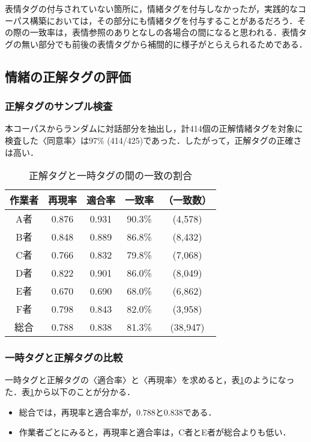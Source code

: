 \documentclass[japanese]{jnlp_1.3c}
\begin{document}
表情タグの付与されていない箇所に，情緒タグを付与しなかったが，実践的なコーパス構築においては，その部分にも情緒タグを付与することがあるだろう．その際の一致率は，表情参照のありとなしの各場合の間になると思われる．表情タグの無い部分でも前後の表情タグから補間的に様子がとらえられるためである．


\subsection{情緒の正解タグの評価} \label{sec4.3}

\subsubsection{正解タグのサンプル検査} \label{sec4.3.1}

本コーパスからランダムに対話部分を抽出し，計414個の正解情緒タグを対象に検査した〈同意率〉は97\% (414/425)であった．したがって，正解タグの正確さは高い．

\begin{table}[b]
\begin{center}
\caption{正解タグと一時タグの間の一致の割合} \label{tab6}
\begin{tabular}{ccccc}
\hline \hline
作業者 & 再現率 & 適合率 & 一致率 & （一致数）\\
\hline
A者    & 0.876  & 0.931  & 90.3\% & (4,578) \\
B者    & 0.848  & 0.889  & 86.8\% & (8,432) \\
C者    & 0.766  & 0.832  & 79.8\% & (7,068) \\
D者    & 0.822  & 0.901  & 86.0\% & (8,049) \\
E者    & 0.670  & 0.690  & 68.0\% & (6,862) \\
F者    & 0.798  & 0.843  & 82.0\% & (3,958) \\
\hline
総合   & 0.788  & 0.838  & 81.3\% & (38,947) \\
\hline
\end{tabular}
\end{center}
\end{table}

\subsubsection{一時タグと正解タグの比較}

一時タグと正解タグの〈適合率〉と〈再現率〉を求めると，表\ref{tab6}のようになった．表\ref{tab6}から以下のことが分かる．
\begin{itemize}
\item 総合では，再現率と適合率が，0.788と0.838である．
\item 作業者ごとにみると，再現率と適合率は，C者とE者が総合よりも低い．
\end{itemize}
\end{document}
